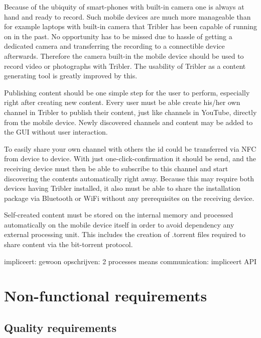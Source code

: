 Because of the ubiquity of smart-phones with built-in camera one is always at hand and ready to record.
Such mobile devices are much more manageable than for example laptops with built-in camera that Tribler has been capable of running on in the past.
No opportunity has to be missed due to hassle of getting a dedicated camera and transferring the recording to a connectible device afterwards.
Therefore the camera built-in the mobile device should be used to record video or photographs with Tribler.
The usability of Tribler as a content generating tool is greatly improved by this. 

Publishing content should be one simple step for the user to perform, especially right after creating new content.
Every user must be able create his/her own channel in Tribler to publish their content, just like channels in YouTube, directly from the mobile device.
Newly discovered channels and content may be added to the GUI without user interaction.

To easily share your own channel with others the id could be transferred via NFC from device to device.
With just one-click-confirmation it should be send, and the receiving device must then be able to subscribe to this channel and start discovering the contents automatically right away.
Because this may require both devices having Tribler installed, it also must be able to share the installation package via Bluetooth or WiFi without any prerequisites on the receiving device.

Self-created content must be stored on the internal memory and processed automatically on the mobile device itself in order to avoid dependency any external processing unit.
This includes the creation of .torrent files required to share content via the bit-torrent protocol.



impliceert: gewoon opschrijven: 2 processes means communication: impliceert API




\section{Non-functional requirements}


\subsection{Quality requirements}


